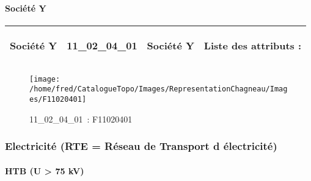 \documentclass[12pt,titlepage,oneside]{book}
\begin{document}
\paragraph{Société Y}
\noindent
\vspace{\baselineskip}

\renewcommand{\arraystretch}{1.2}
\begin{supertabular}{|p{10cm}|c|p{13cm}|p{12cm}|}
 Société Y & 11\_02\_04\_01 & Société Y & Liste des attributs :
\begin{enumerate}
\end{enumerate}
\\
\hline
\end{supertabular}
\begin{figure}[h!]
  \hfill         %
  \begin{minipage}[t]{3cm}
    \begin{center}
      \texttt{[image: /home/fred/CatalogueTopo/Images/RepresentationChagneau/Images/F11020401]}
      \caption[~11\_02\_04\_01]{\small{11\_02\_04\_01~:} \tiny{F11020401}}\label{F11020401}
    \end{center}
  \end{minipage}
\end{figure}

\subsubsection{\large Electricité (RTE = Réseau de Transport d électricité)}
\paragraph{HTB (U > 75 kV)}
\noindent
\vspace{\baselineskip}
\end{document}
